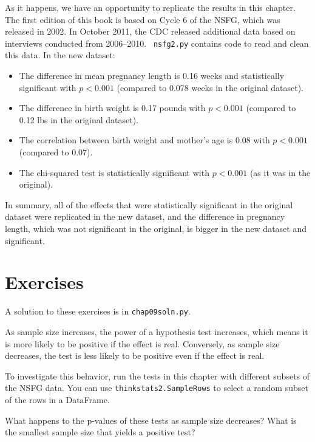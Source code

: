 \documentclass[12pt]{book}
\begin{document}
As it happens, we have an opportunity to replicate the results in this
chapter.  The first edition of this book is based on Cycle 6 of the
NSFG, which was released in 2002.  In October 2011, the CDC released
additional data based on interviews conducted from 2006--2010.  {\tt
  nsfg2.py} contains code to read and clean this data.  In the new
dataset:

\begin{itemize}

\item The difference in mean pregnancy length is
0.16 weeks and statistically significant with $p < 0.001$ (compared
to 0.078 weeks in the original dataset).
 

\item The difference in birth weight is 0.17 pounds with $p < 0.001$
(compared to 0.12 lbs in the original dataset).

\item The correlation between birth weight and mother's age is
0.08 with $p < 0.001$ (compared to 0.07).

\item The chi-squared test is statistically significant with
$p < 0.001$ (as it was in the original).

\end{itemize}

In summary, all of the effects that were statistically significant
in the original dataset were replicated in the new dataset, and the
difference in pregnancy length, which was not significant in the
original, is bigger in the new dataset and significant.


\section{Exercises}

A solution to these exercises is in \verb"chap09soln.py".

\begin{exercise}
As sample size increases, the power of a hypothesis test increases,
which means it is more likely to be positive if the effect is real.
Conversely, as sample size decreases, the test is less likely to
be positive even if the effect is real.

To investigate this behavior, run the tests in this chapter with
different subsets of the NSFG data.  You can use {\tt thinkstats2.SampleRows}
to select a random subset of the rows in a DataFrame.

What happens to the p-values of these tests as sample size decreases?
What is the smallest sample size that yields a positive test?
\end{exercise}
\end{document}
